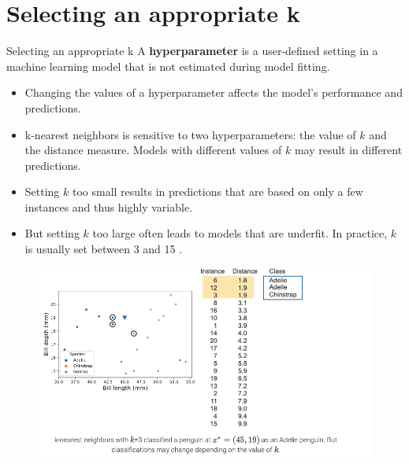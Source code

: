 \documentclass[8pt,dvipsnames]{beamer}
\begin{document}
\section{Selecting an appropriate k}
\begin{frame}{Selecting an appropriate k}
	A \textbf{hyperparameter} is a user-defined setting in a machine learning model that is not estimated during model fitting.
	\begin{itemize}
		\item Changing the values of a hyperparameter affects the model's performance and predictions.
		\item k-nearest neighbors is sensitive to two hyperparameters: the value of \(k\) and the distance measure. Models with different values of \(k\) may result in different predictions.
		\item Setting \(k\) too small results in predictions that are based on only a few instances and thus highly variable.
		\item But setting \(k\) too large often leads to models that are underfit. In practice, \(k\) is usually set between 3 and 15 .
	\end{itemize}
\end{frame}

\begin{frame}
	\begin{figure}[ht]
		\centering
		\includegraphics[width=\linewidth]{imgs/knn_22.png}
	\end{figure}
\end{frame}
\end{document}
